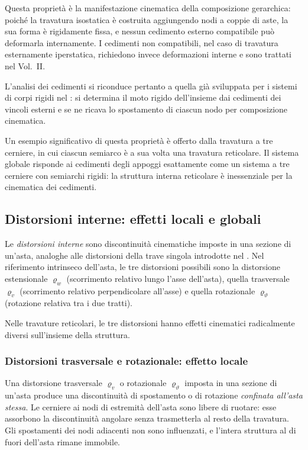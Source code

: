 \begin{oss}
	Questa proprietà è la manifestazione cinematica
	della composizione gerarchica: poiché la travatura
	isostatica è costruita aggiungendo nodi a coppie
	di aste, la sua forma è rigidamente fissa, e nessun
	cedimento esterno compatibile può deformarla
	internamente. I cedimenti non compatibili, nel caso
	di travatura esternamente iperstatica, richiedono
	invece deformazioni interne e sono trattati nel
	Vol.~II.
\end{oss}

L'analisi dei cedimenti si riconduce pertanto a quella
già sviluppata per i sistemi di corpi rigidi nel
: si determina il
moto rigido dell'insieme dai cedimenti dei vincoli
esterni e se ne ricava lo spostamento di ciascun
nodo per composizione cinematica.

Un esempio significativo di questa proprietà è
offerto dalla travatura a tre cerniere, in cui
ciascun semiarco è a sua volta una travatura
reticolare. Il sistema globale risponde ai cedimenti
degli appoggi esattamente come un sistema a tre
cerniere con semiarchi rigidi: la struttura interna
reticolare è inessenziale per la cinematica dei
cedimenti.

\subsection{Distorsioni interne: effetti locali e globali}
\label{subsec:distorsioni_reticolare}


Le \emph{distorsioni interne} sono discontinuità
cinematiche imposte in una sezione di un'asta,
analoghe alle distorsioni della trave singola
introdotte nel . Nel
riferimento intrinseco dell'asta, le tre distorsioni
possibili sono la distorsione estensionale $\varrho_w$
(scorrimento relativo lungo l'asse dell'asta), quella
trasversale $\varrho_v$ (scorrimento relativo
perpendicolare all'asse) e quella rotazionale
$\varrho_\vartheta$ (rotazione relativa tra i due
tratti).

Nelle travature reticolari, le tre distorsioni hanno
effetti cinematici radicalmente diversi sull'insieme
della struttura.

\subsubsection{Distorsioni trasversale e rotazionale: 	effetto locale}
Una distorsione trasversale $\varrho_v$ o rotazionale
$\varrho_\vartheta$ imposta in una sezione di un'asta
produce una discontinuità di spostamento o di rotazione
\emph{confinata all'asta stessa}. Le cerniere ai nodi
di estremità dell'asta sono libere di ruotare: esse
assorbono la discontinuità angolare senza trasmetterla
al resto della travatura. Gli spostamenti dei nodi
adiacenti non sono influenzati, e l'intera struttura
al di fuori dell'asta rimane immobile.

